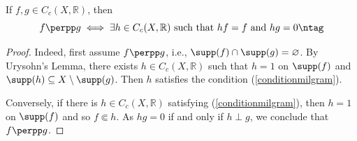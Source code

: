 \begin{lemma}\label{lemmamilgram}
If $f,g\in C_c(X,\mathbb{R})$, then
\[f\perpp g\iff \exists h\in C_c(X,\mathbb{R})\text{ such that }hf=f\text{ and }hg=0\ntag\label{conditionmilgram}\]
\end{lemma}
\begin{proof}
Indeed, first assume $f\perpp g$, i.e., $\supp(f)\cap\supp(g)=\varnothing$. By Urysohn's Lemma, there exists $h\in C_c(X,\mathbb{R})$ such that $h=1$ on $\supp(f)$ and $\supp(h)\subseteq X\setminus\supp(g)$. Then $h$ satisfies the condition (\ref{conditionmilgram}).

Conversely, if there is $h\in C_c(X,\mathbb{R})$ satisfying (\ref{conditionmilgram}), then $h=1$ on $\supp(f)$ and so $f\Subset h$. As $hg=0$ if and only if $h\perp g$, we conclude that $f\perpp g$.\qedhere
\end{proof}

